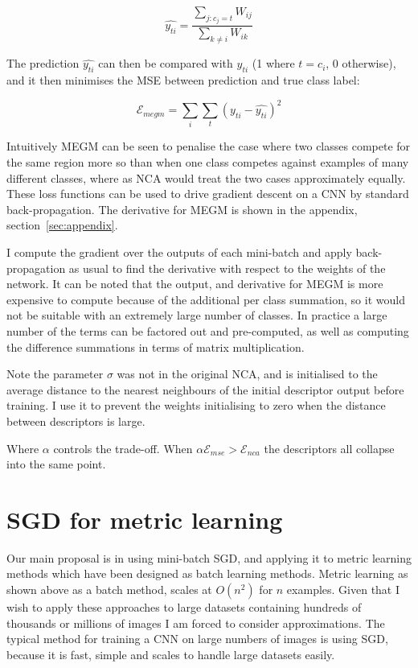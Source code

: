 \begin{equation}
\label{eq:megm_pred}
\hat{y_{ti}} = \frac{\sum_{j:c_j = t}W_{ij}}{\sum_{k \neq i}{W_{ik}}}
\end{equation}

The prediction $ \hat{y_{ti}} $ can then be compared with $ y_{ti} $ (1 where $ t = c_i $, 0 otherwise), and it then minimises the \gls{MSE} between prediction and true class label:

\begin{equation}
\label{eq:megm_loss}
\mathcal{E}_{megm} =  \sum_i\sum_t{(y_{ti} - \hat{y_{ti}})^2}
\end{equation}

Intuitively \gls{MEGM} can be seen to penalise the case where two classes compete for the same region more so than when one class competes against examples of many different classes, where as \gls{NCA} would treat the two cases approximately equally. These loss functions can be used to drive gradient descent on a \gls{CNN} by standard back-propagation. The derivative for \gls{MEGM} is shown in the appendix, section~\ref{sec:appendix}.

I compute the gradient over the outputs of each mini-batch and apply back-propagation as usual to find the derivative with respect to the weights of the network. It can be noted that the output, and derivative for \gls{MEGM} is more expensive to compute because of the additional per class summation, so it would not be suitable with an extremely large number of classes. In practice a large number of the terms can be factored out and pre-computed, as well as computing the difference summations in terms of matrix multiplication.

Note the parameter $ \sigma $ was not in the original NCA, and is initialised to the average distance to the nearest neighbours of the initial descriptor output before training. I use it to prevent the weights initialising to zero when the distance between descriptors is large.


Where $\alpha $ controls the trade-off. When $ \alpha \mathcal{E}_{mse} > \mathcal{E}_{nca} $ the descriptors all collapse into the same point.


\section{SGD for metric learning}

Our main proposal is in using mini-batch \gls{SGD}, and applying it to metric learning methods which have been designed as batch learning methods. Metric learning as shown above as a batch method, scales at $ O(n^2) $ for $ n $ examples. Given that I wish to apply these approaches to large datasets containing hundreds of thousands or millions of images I am forced to consider approximations. The typical method for training a \gls{CNN} on large numbers of images is using \gls{SGD}, because it is fast, simple and scales to handle large datasets easily. 

